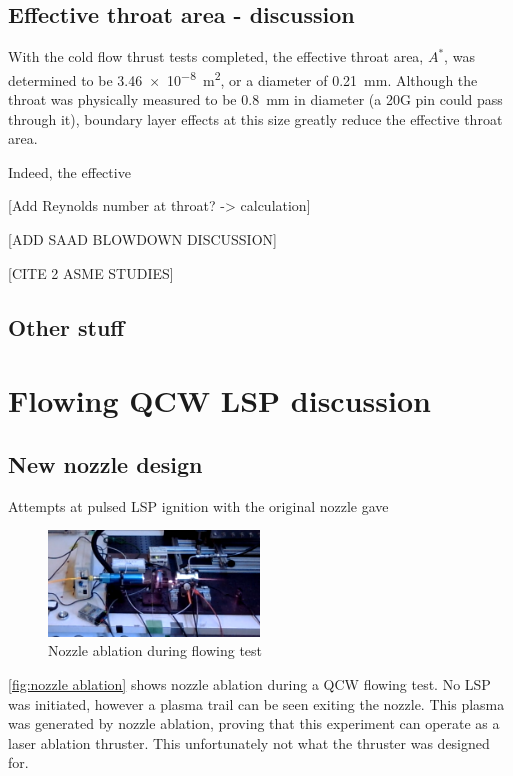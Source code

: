     \subsection{Effective throat area - discussion}
            
        With the cold flow thrust tests completed, the effective throat area, $A^*$, was determined to be \qty{3.46e-8}{m^2}, or a diameter of \qty{0.21}{mm}. Although the throat was physically measured to be \qty{0.8}{mm} in diameter (a 20G pin could pass through it), boundary layer effects at this size greatly reduce the effective throat area.

        Indeed, the effective

        [Add Reynolds number at throat? -> calculation]

        [ADD SAAD BLOWDOWN DISCUSSION]

        [CITE 2 ASME STUDIES]

    \subsection*{Other stuff}

\section{Flowing QCW LSP discussion}

    \subsection{New nozzle design}

    Attempts at pulsed LSP ignition with the original nozzle gave 

    \begin{figure}[!ht]
        \centering
        \includegraphics[width=0.5\textwidth]{assets/5 discussion/Nozzle ablation.png}
        \caption{Nozzle ablation during flowing test}
        \label{fig:nozzle ablation}
    \end{figure}

    \autoref{fig:nozzle ablation} shows nozzle ablation during a QCW flowing test. No LSP was initiated, however a plasma trail can be seen exiting the nozzle. This plasma was generated by nozzle ablation, proving that this experiment can operate as a laser ablation thruster. This unfortunately not what the thruster was designed for. 

